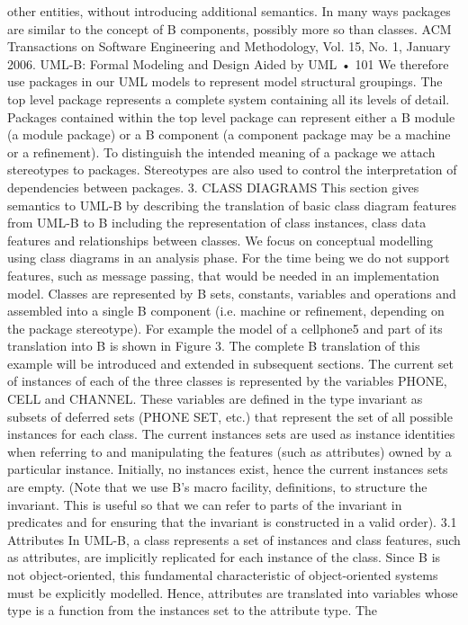 other entities, without introducing additional semantics. In many ways packages are similar to the concept of B components, possibly more so than classes.
ACM Transactions on Software Engineering and Methodology, Vol. 15, No. 1, January 2006.
UML-B: Formal Modeling and Design Aided by UML • 101
We therefore use packages in our UML models to represent model structural
groupings. The top level package represents a complete system containing all
its levels of detail. Packages contained within the top level package can represent either a B module (a module package) or a B component (a component
package may be a machine or a refinement). To distinguish the intended meaning of a package we attach stereotypes to packages. Stereotypes are also used
to control the interpretation of dependencies between packages.
3. CLASS DIAGRAMS
This section gives semantics to UML-B by describing the translation of basic class diagram features from UML-B to B including the representation of
class instances, class data features and relationships between classes. We focus on conceptual modelling using class diagrams in an analysis phase. For the
time being we do not support features, such as message passing, that would be
needed in an implementation model. Classes are represented by B sets, constants, variables and operations and assembled into a single B component (i.e.
machine or refinement, depending on the package stereotype). For example the
model of a cellphone5 and part of its translation into B is shown in Figure 3.
The complete B translation of this example will be introduced and extended in
subsequent sections.
The current set of instances of each of the three classes is represented by
the variables PHONE, CELL and CHANNEL. These variables are defined in the
type invariant as subsets of deferred sets (PHONE SET, etc.) that represent
the set of all possible instances for each class. The current instances sets are
used as instance identities when referring to and manipulating the features
(such as attributes) owned by a particular instance. Initially, no instances exist,
hence the current instances sets are empty. (Note that we use B’s macro facility,
definitions, to structure the invariant. This is useful so that we can refer to parts
of the invariant in predicates and for ensuring that the invariant is constructed
in a valid order).
3.1 Attributes
In UML-B, a class represents a set of instances and class features, such as
attributes, are implicitly replicated for each instance of the class. Since B
is not object-oriented, this fundamental characteristic of object-oriented systems must be explicitly modelled. Hence, attributes are translated into variables whose type is a function from the instances set to the attribute type. The
